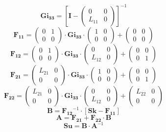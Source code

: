 \[ \mathbf{Gi_{33}} = \left[\mathbf{I} -\left(\begin{smallmatrix} 0 & 0 \\ L_{11} & 0 \end{smallmatrix}\right)\right]^{-1} \]
\[ \mathbf{F_{11}} = \left(\begin{smallmatrix} 0 & 1 \\ 0 & 0 \end{smallmatrix}\right) \cdot\mathbf{Gi_{33}}\cdot \left(\begin{smallmatrix} 1 & 0 \\ 0 & 0 \end{smallmatrix}\right) + \left(\begin{smallmatrix} 0 & 0 \\ 0 & 0 \end{smallmatrix}\right) \]
\[ \mathbf{F_{12}} = \left(\begin{smallmatrix} 0 & 1 \\ 0 & 0 \end{smallmatrix}\right) \cdot\mathbf{Gi_{33}}\cdot \left(\begin{smallmatrix} 0 & 0 \\ L_{12} & 0 \end{smallmatrix}\right) + \left(\begin{smallmatrix} 0 & 0 \\ 0 & 1 \end{smallmatrix}\right) \]
\[ \mathbf{F_{21}} = \left(\begin{smallmatrix} L_{21} & 0 \\ 0 & 0 \end{smallmatrix}\right) \cdot\mathbf{Gi_{33}}\cdot \left(\begin{smallmatrix} 1 & 0 \\ 0 & 0 \end{smallmatrix}\right) + \left(\begin{smallmatrix} 0 & 0 \\ 0 & 1 \end{smallmatrix}\right) \]
\[ \mathbf{F_{22}} = \left(\begin{smallmatrix} L_{21} & 0 \\ 0 & 0 \end{smallmatrix}\right) \cdot\mathbf{Gi_{33}}\cdot \left(\begin{smallmatrix} 0 & 0 \\ L_{12} & 0 \end{smallmatrix}\right) + \left(\begin{smallmatrix} L_{22} & 0 \\ 0 & 0 \end{smallmatrix}\right) \]
\[ \mathbf{B}=\mathbf{F_{12}}^{-1}\cdot\left[\mathbf{Sk}-\mathbf{F_{11}}\right] \]
\[ \mathbf{A}=\mathbf{F_{21}}+\mathbf{F_{22}}\cdot\mathbf{B} \]
\[ \mathbf{Su}=\mathbf{B}\cdot\mathbf{A}^{-1} \]
